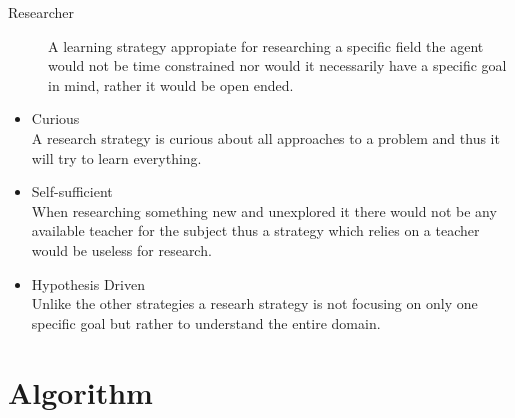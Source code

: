 \documentclass[master.tex]{subfiles}
\begin{document}
    \begin{description}
    \item [{Researcher}] A learning strategy appropiate for researching a specific
    field the agent would not be time constrained nor would it necessarily
    have a specific goal in mind, rather it would be open ended.\end{description}
    \begin{itemize}
    \item Curious\\
    A research strategy is curious about all approaches to a problem and
    thus it will try to learn everything.
    \item Self-sufficient\\
    When researching something new and unexplored it there would not be
    any available teacher for the subject thus a strategy which relies
    on a teacher would be useless for research.
    \item Hypothesis Driven\\
    Unlike the other strategies a researh strategy is not focusing on
    only one specific goal but rather to understand the entire domain.
    \end{itemize}

    \section{Algorithm}
		
\end{document}
